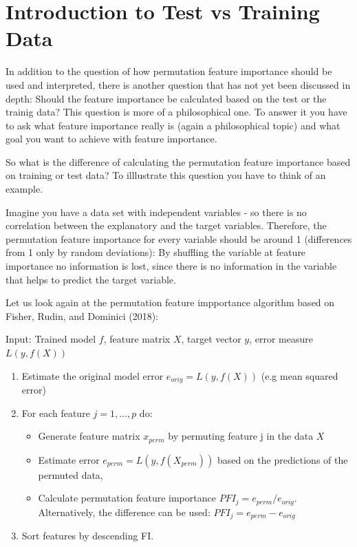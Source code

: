 \documentclass[
]{krantz}
\providecommand{\tightlist}{%
  \setlength{\itemsep}{0pt}\setlength{\parskip}{0pt}}
\begin{document}
\hypertarget{introduction-to-test-vs-training-data}{%
\section{Introduction to Test vs Training Data}\label{introduction-to-test-vs-training-data}}

In addition to the question of how permutation feature importance should be used and interpreted, there is another question that has not yet been discussed in depth: Should the feature importance be calculated based on the test or the trainig data?
This question is more of a philosophical one. To answer it you have to ask what feature importance really is (again a philosophical topic) and what goal you want to achieve with feature importance.

So what is the difference of calculating the permutation feature importance based on training or test data? To illlustrate this question you have to think of an example.

Imagine you have a data set with independent variables - so there is no correlation between the explanatory and the target variables. Therefore, the permutation feature importance for every variable should be around 1 (differences from 1 only by random deviations): By shuffling the variable at feature importance no information is lost, since there is no information in the variable that helps to predict the target variable.

Let us look again at the permutation feature impportance algorithm based on Fisher, Rudin, and Dominici (2018):

Input: Trained model \(f\), feature matrix \(X\), target vector \(y\), error measure \(L(y,f(X))\)

\begin{enumerate}
\def\labelenumi{\arabic{enumi}.}
\tightlist
\item
  Estimate the original model error \(e_{orig} = L(y,f(X))\) (e.g mean squared error)
\item
  For each feature \(j = 1,...,p\) do:

  \begin{itemize}
  \tightlist
  \item
    Generate feature matrix \(x_{perm}\) by permuting feature j in the data \(X\)
  \item
    Estimate error \(e_{perm} = L(y,f(X_{perm}))\) based on the predictions of the permuted data,
  \item
    Calculate permutation feature importance \(PFI_{j} = e_{perm}/e_{orig}\). Alternatively, the difference can be used: \(PFI_{j} = e_{perm} - e_{orig}\)
  \end{itemize}
\item
  Sort features by descending FI.
\end{enumerate}
\end{document}
